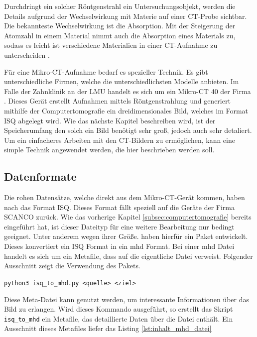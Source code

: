 Durchdringt ein solcher Röntgenstrahl ein Untersuchungsobjekt, werden die Details
aufgrund der Wechselwirkung mit Materie auf einer \ac{CT}-Probe sichtbar. Die bekannteste
Wechselwirkung ist die Absorption. Mit der Steigerung der Atomzahl in einem
Material nimmt auch die Absorption eines Materials zu, sodass es leicht ist verschiedene
Materialien in einer \ac{CT}-Aufnahme zu unterscheiden \citep[vgl.][K.~1]{nib2024}.

Für eine Mikro-\ac{CT}-Aufnahme bedarf es spezieller Technik. Es gibt unterschiedliche
Firmen, welche die unterschiedlichsten Modelle anbieten. Im Falle der Zahnklinik
an der \ac{LMU} handelt es sich um ein Mikro-\ac{CT} 40 der Firma \citet{scanco2024}.
Dieses Gerät erstellt Aufnahmen mittels Röntgenstrahlung und generiert mithilfe der
Computertomografie ein dreidimensionales Bild, welches im Format \ac{ISQ} abgelegt
wird. Wie das nächste Kapitel beschreiben wird, ist der Speicherumfang den solch
ein Bild benötigt sehr groß, jedoch auch sehr detaliert. Um ein einfacheres Arbeiten
mit den \ac{CT}-Bildern zu ermöglichen, kann eine simple Technik angewendet werden,
die hier beschrieben werden soll.

\subsection{Datenformate}
\label{subsec:datensätze} Die rohen Datensätze, welche direkt aus dem Mikro-\ac{CT}-Gerät
kommen, haben nach \citet{scanco2024} das Format \ac{ISQ}. Dieses Format fällt
speziell auf die Geräte der Firma SCANCO zurück. Wie das vorherige Kapitel \ref{subsec:computertomografie}
bereits eingeführt hat, ist dieser Dateityp für eine weitere Bearbeitung nur
bedingt geeignet. Unter anderem wegen ihrer Größe. \citet{RoeschKunzelmann2018} haben
hierfür ein Paket entwickelt. Dieses konvertiert ein \ac{ISQ} Format in ein \ac{mhd}
Format. Bei einer \ac{mhd} Datei handelt es sich um ein Metafile, dass auf die eigentliche
Datei verweist. Folgender Ausschnitt zeigt die Verwendung des Pakets.
\begin{center}
	\texttt{python3 isq\_to\_mhd.py <quelle> <ziel>}
\end{center}
Diese Meta-Datei kann genutzt werden, um interessante Informationen über das
Bild zu erlangen. Wird dieses Kommando ausgeführt, so erstellt das Skript
\texttt{isq\_to\_mhd} ein Metafile, das detaillierte Daten über die Datei
enthält. Ein Ausschnitt dieses Metafiles liefer das Listing \ref{lst:inhalt_mhd_datei}


